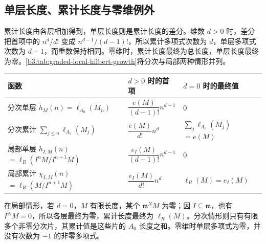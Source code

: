 \subsection{单层长度、累计长度与零维例外}
\label{b3:subsec:1104:04}

累计长度由各层相加得到，单层长度则是累计长度的差分。维数 \(d>0\) 时，差分把首项中的 \(n^d/d!\) 变成 \(n^{d-1}/(d-1)!\)，所以累计多项式次数为 \(d\)，单层多项式次数为 \(d-1\)，而重数保持相同。零维时，累计长度最终为总长度，单层长度最终为零。\cref{b3:tab:graded-local-hilbert-growth}将分次与局部两种情形并列。

\begin{center}
	\begin{minipage}{\textwidth}
		\makeatletter
		\def\@captype{table}
		\makeatother
		\centering
		\caption[分次与局部 Hilbert 函数的增长]{分次与局部 Hilbert 函数的增长。分次行中，\(A\) 为交换标准分次环，\(A_0\) 为 Artin 环，\(M\ne0\) 为有限生成分次 \(A\) 模，\(d=\dim_A M\)。局部行中，\((R,\mathfrak m)\) 为交换 Noether 局部环，\(I\) 为 \(\mathfrak m\) 准素理想，\(M\ne0\) 为有限生成 \(R\) 模，\(d=\dim_R M\)。所有首项与最终值均对充分大的 \(n\) 而言。}
		\label{b3:tab:graded-local-hilbert-growth}
		\begin{tabularx}{\textwidth}{@{}>{\raggedright\arraybackslash}p{}>{\raggedright\arraybackslash}p{}>{\raggedright\arraybackslash}X@{}}
			\toprule
			函数 & \(d>0\) 时的首项 & \(d=0\) 时的最终值\\
			\midrule
			分次单层 \(h_M(n)=\ell_{A_0}(M_n)\) & \(\dfrac{e(M)}{(d-1)!}n^{d-1}\) & \(0\)\\
			分次累计 \(\sum_{j\le n}\ell_{A_0}(M_j)\) & \(\dfrac{e(M)}{d!}n^d\) & \(\sum_j\ell_{A_0}(M_j)\)\newline\(=e(M)\)\\
			局部单层 \(h_{I,M}(n)\)\newline\(=\ell_R(I^nM/I^{n+1}M)\) & \(\dfrac{e_I(M)}{(d-1)!}n^{d-1}\) & \(0\)\\
			局部累计 \(\chi_{I,M}(n)\)\newline\(=\ell_R(M/I^{n+1}M)\) & \(\dfrac{e_I(M)}{d!}n^d\) & \(\ell_R(M)=e_I(M)\)\\
			\bottomrule
		\end{tabularx}
	\end{minipage}
\end{center}

在局部情形，若 \(d=0\)，\(M\) 有限长度，某个 \(\mathfrak m^NM\) 为零；因 \(I\subseteq\mathfrak m\)，也有 \(I^NM=0\)，所以各层最终为零，累计长度最终为 \(\ell_R(M)\)。分次情形则只有有限多个非零分次片，其累计值是这些片的 \(A_0\) 长度之和。零维时单层多项式为零，并没有次数为 \(-1\) 的非零多项式。

